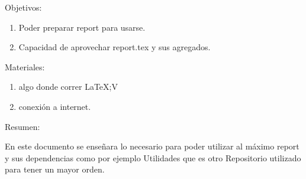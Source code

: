 \documentclass[11pt, letterpaper]{article}
\begin{document}
 
		
	\begin{block}{Objetivos:}
		\begin{enumerate}
			\item Poder preparar report para usarse.
			\item Capacidad de aprovechar report.tex y sus agregados.
		\end{enumerate}
	\end{block}

	\begin{block}{Materiales:}
		\begin{enumerate}
			\item algo donde correr \LaTeX \hspace{3mm};V
			\item conexión a internet.
		\end{enumerate}
	\end{block}

	\begin{block}{Resumen:\\}
		
		En este documento se enseñara lo necesario para poder utilizar al máximo report y sus dependencias como por ejemplo Utilidades que es otro Repositorio utilizado para tener un mayor orden.
	\end{block}
\end{document}
